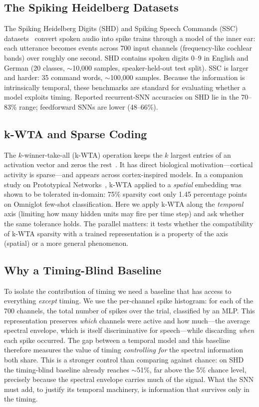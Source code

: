 \documentclass[11pt]{article}
\begin{document}
\subsection{The Spiking Heidelberg Datasets}
The Spiking Heidelberg Digits (SHD) and Spiking Speech Commands (SSC) datasets~\citep{cramer2020heidelberg} convert spoken audio into spike trains through a model of the inner ear: each utterance becomes events across 700 input channels (frequency-like cochlear bands) over roughly one second. SHD contains spoken digits 0--9 in English and German (20 classes, $\sim$10{,}000 samples, speaker-held-out test split). SSC is larger and harder: 35 command words, $\sim$100{,}000 samples. Because the information is intrinsically temporal, these benchmarks are standard for evaluating whether a model exploits timing. Reported recurrent-SNN accuracies on SHD lie in the 70--83\% range; feedforward SNNs are lower (48--66\%).

\subsection{k-WTA and Sparse Coding}
The $k$-winner-take-all (k-WTA) operation keeps the $k$ largest entries of an activation vector and zeros the rest~\citep{maass2000computational}. It has direct biological motivation---cortical activity is sparse---and appears across cortex-inspired models. In a companion study on Prototypical Networks~\citep{pinho2026kwta}, k-WTA applied to a \emph{spatial} embedding was shown to be tolerated in-domain: 75\% sparsity cost only 1.45 percentage points on Omniglot few-shot classification. Here we apply k-WTA along the \emph{temporal} axis (limiting how many hidden units may fire per time step) and ask whether the same tolerance holds. The parallel matters: it tests whether the compatibility of k-WTA sparsity with a trained representation is a property of the axis (spatial) or a more general phenomenon.

\subsection{Why a Timing-Blind Baseline}
To isolate the contribution of timing we need a baseline that has access to everything \emph{except} timing. We use the per-channel spike histogram: for each of the 700 channels, the total number of spikes over the trial, classified by an MLP. This representation preserves \emph{which} channels were active and how much---the average spectral envelope, which is itself discriminative for speech---while discarding \emph{when} each spike occurred. The gap between a temporal model and this baseline therefore measures the value of timing \emph{controlling for} the spectral information both share. This is a stronger control than comparing against chance: on SHD the timing-blind baseline already reaches $\sim$51\%, far above the 5\% chance level, precisely because the spectral envelope carries much of the signal. What the SNN must add, to justify its temporal machinery, is information that survives only in the timing.
\end{document}
